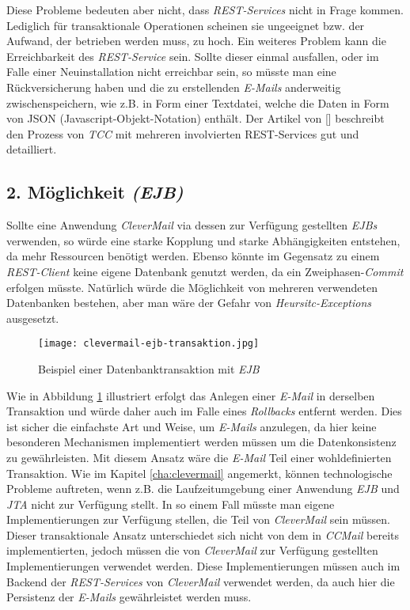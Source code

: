 \newline
\newline
Diese Probleme bedeuten aber nicht, dass \emph{REST-Services} nicht in Frage kommen. Lediglich für transaktionale Operationen scheinen sie ungeeignet bzw. der Aufwand, der betrieben werden muss, zu hoch. Ein weiteres Problem kann die Erreichbarkeit des \emph{REST-Service} sein. Sollte dieser einmal ausfallen, oder im Falle einer Neuinstallation nicht erreichbar sein, so müsste man eine Rückversicherung haben und die zu erstellenden \emph{E-Mails} anderweitig zwischenspeichern, wie z.B. in Form einer Textdatei, welche die Daten in Form von JSON (Javascript-Objekt-Notation) enthält.
\newline
\newline
Der Artikel von [\cite{atomikosTcc}] beschreibt den Prozess von \emph{TCC} mit mehreren involvierten REST-Services gut und detailliert.

\subsection{2. Möglichkeit \emph{(EJB)}}
Sollte eine Anwendung \emph{CleverMail} via dessen zur Verfügung gestellten \emph{EJBs} verwenden, so würde eine starke Kopplung und starke Abhängigkeiten entstehen, da mehr Ressourcen benötigt werden. Ebenso könnte im Gegensatz zu einem \emph{REST-Client} keine eigene Datenbank genutzt werden, da ein Zweiphasen-\emph{Commit} erfolgen müsste. Natürlich würde die Möglichkeit von mehreren verwendeten Datenbanken bestehen, aber man wäre der Gefahr von \emph{Heursitc-Exceptions} ausgesetzt.
\newpage
\begin{figure}[h]
\centering
\texttt{[image: clevermail-ejb-transaktion.jpg]} %
\caption{Beispiel einer Datenbanktransaktion mit \emph{EJB}}
\label{fig:clevermail-rest-tcc}
\end{figure}
Wie in Abbildung \ref{fig:clevermail-rest-tcc} illustriert erfolgt das Anlegen einer \emph{E-Mail} in derselben Transaktion und würde daher auch im Falle eines \emph{Rollbacks} entfernt werden. Dies ist sicher die einfachste Art und Weise, um \emph{E-Mails} anzulegen, da hier keine besonderen Mechanismen implementiert werden müssen um die Datenkonsistenz zu gewährleisten. Mit diesem Ansatz wäre die \emph{E-Mail} Teil einer wohldefinierten Transaktion.
\newline
\newline
Wie im Kapitel \ref{cha:clevermail} angemerkt, können technologische Probleme auftreten, wenn z.B. die Laufzeitumgebung einer Anwendung \emph{EJB} und \emph{JTA} nicht zur Verfügung stellt. In so einem Fall müsste man eigene Implementierungen zur Verfügung stellen, die Teil von \emph{CleverMail} sein müssen.
\newline
\newline
Dieser transaktionale Ansatz unterschiedet sich nicht von dem in \emph{CCMail} bereits implementierten, jedoch müssen die von \emph{CleverMail} zur Verfügung gestellten Implementierungen verwendet werden. Diese Implementierungen müssen auch im Backend der \emph{REST-Services} von \emph{CleverMail} verwendet werden, da auch hier die Persistenz der \emph{E-Mails} gewährleistet werden muss.
 
